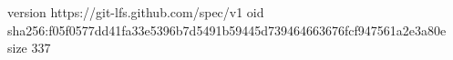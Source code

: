 version https://git-lfs.github.com/spec/v1
oid sha256:f05f0577dd41fa33e5396b7d5491b59445d739464663676fcf947561a2e3a80e
size 337
